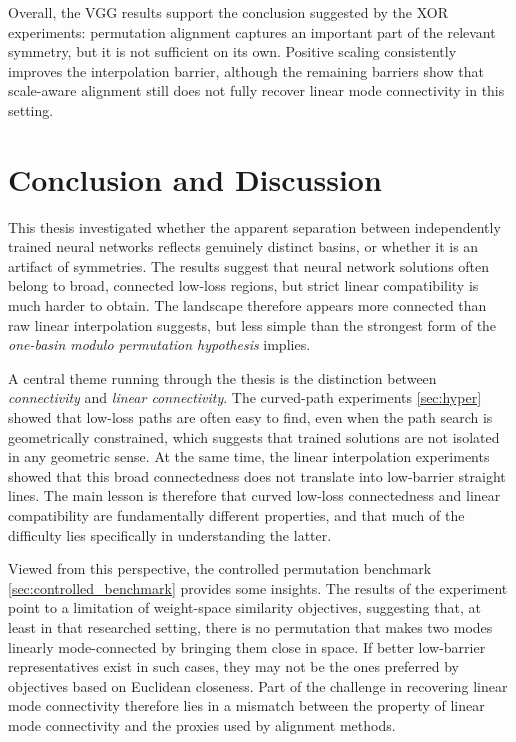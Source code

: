 \documentclass[11pt,a4paper]{report}
\begin{document}
Overall, the VGG results support the conclusion suggested by the XOR experiments: permutation alignment captures an important part of the relevant symmetry, but it is not sufficient on its own. Positive scaling consistently improves the interpolation barrier, although the remaining barriers show that scale-aware alignment still does not fully recover linear mode connectivity in this setting.

\chapter{Conclusion and Discussion}
\label{chap:conclusion}

This thesis investigated whether the apparent separation between independently trained neural networks reflects genuinely distinct basins, or whether it is an artifact of symmetries. The results suggest that neural network solutions often belong to broad, connected low-loss regions, but strict linear compatibility is much harder to obtain. The landscape therefore appears more connected than raw linear interpolation suggests, but less simple than the strongest form of the \textit{one-basin modulo permutation hypothesis} implies.

A central theme running through the thesis is the distinction between \emph{connectivity} and \emph{linear connectivity}. The curved-path experiments \ref{sec:hyper} showed that low-loss paths are often easy to find, even when the path search is geometrically constrained, which suggests that trained solutions are not isolated in any geometric sense. At the same time, the linear interpolation experiments showed that this broad connectedness does not translate into low-barrier straight lines. The main lesson is therefore that curved low-loss connectedness and linear compatibility are fundamentally different properties, and that much of the difficulty lies specifically in understanding the latter.

Viewed from this perspective, the controlled permutation benchmark \ref{sec:controlled_benchmark} provides some insights. The results of the experiment point to a limitation of weight-space similarity objectives, suggesting that, at least in that researched setting, there is no permutation that makes two modes linearly mode-connected by bringing them close in space. If better low-barrier representatives exist in such cases, they may not be the ones preferred by objectives based on Euclidean closeness. Part of the challenge in recovering linear mode connectivity therefore lies in a mismatch between the property of linear mode connectivity and the proxies used by alignment methods.
\end{document}

